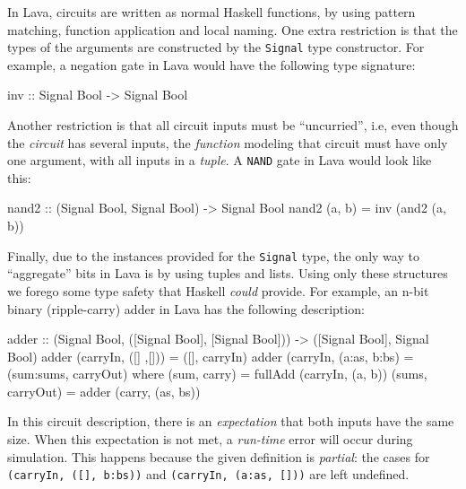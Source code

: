             In Lava, circuits are written as normal Haskell functions, by using pattern matching,
            function application and local naming.
            One extra restriction is that the types of the arguments are
            constructed by the \texttt{Signal} type constructor.
            For example, a negation gate in Lava would have the following type signature:

            \begin{haskellcode}
        inv :: Signal Bool -> Signal Bool
            \end{haskellcode}

            Another restriction is that all circuit inputs must be ``uncurried'', i.e,
            even though the \emph{circuit} has several inputs, the \emph{function} modeling that circuit
            must have only one argument, with all inputs in a \emph{tuple}.
            A \texttt{NAND} gate in Lava would look like this:

            \begin{haskellcode}
        nand2 :: (Signal Bool, Signal Bool) -> Signal Bool
        nand2 (a, b) = inv (and2 (a, b))
            \end{haskellcode}

            Finally, due to the instances provided for the \texttt{Signal} type, the only way to
            ``aggregate'' bits in Lava is by using tuples and lists.
            Using only these structures we forego some type safety that Haskell \emph{could} provide.
            For example, an n-bit binary (ripple-carry) adder in Lava has the following description:

            \begin{haskellcode}
        adder :: (Signal Bool, ([Signal Bool], [Signal Bool])) -> ([Signal Bool], Signal Bool)
        adder (carryIn, ([] ,[]))    = ([], carryIn)
        adder (carryIn, (a:as, b:bs) = (sum:sums, carryOut)
            where
                (sum, carry)     = fullAdd (carryIn, (a, b))
                (sums, carryOut) = adder (carry, (as, bs))
            \end{haskellcode}

            In this circuit description, there is an \emph{expectation} that both inputs have the same size.
            When this expectation is not met, a \emph{run-time} error will occur during simulation.
            This happens because the given definition is \emph{partial}:
            the cases for \texttt{(carryIn, ([], b:bs))} and \texttt{(carryIn, (a:as, []))} are left undefined.

